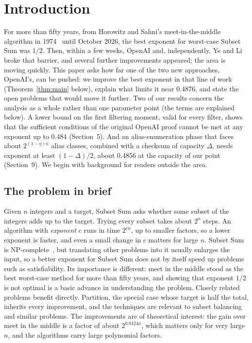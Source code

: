 \documentclass[11pt]{article}
\theoremstyle{plain}
\begin{document}
\section{Introduction}

For more than fifty years, from Horowitz and Sahni's meet-in-the-middle algorithm in 1974~\cite{hs} until October 2026, the best exponent for worst-case Subset Sum was $1/2$. Then, within a few weeks, OpenAI and, independently, Ye and Li broke that barrier, and several further improvements appeared; the area is moving quickly. This paper asks how far one of the two new approaches, OpenAI's, can be pushed: we improve the best exponent in that line of work (Theorem~\ref{thm:main} below), explain what limits it near 0.4876, and state the open problems that would move it further. Two of our results concern the analysis as a whole rather than one parameter point (the terms are explained below). A lower bound on the first filtering moment, valid for every filter, shows that the sufficient conditions of the original OpenAI proof cannot be met at any exponent up to 0.484 (Section~5). And an alias-enumeration phase that faces about $2^{(1-\eta)n}$ alias classes, combined with a checksum of capacity $\Delta$, needs exponent at least $(1 - \Delta)/2$, about 0.4856 at the capacity of our point (Section~9). We begin with background for readers outside the area.

\subsection*{The problem in brief}
Given $n$ integers and a target, Subset Sum asks whether some subset of the integers adds up to the target. Trying every subset takes about $2^n$ steps. An algorithm with \emph{exponent} $c$ runs in time $2^{cn}$, up to smaller factors, so a lower exponent is faster, and even a small change in $c$ matters for large $n$. Subset Sum is NP-complete~\cite{karp}, but translating other problems into it usually enlarges the input, so a better exponent for Subset Sum does not by itself speed up problems such as satisfiability. Its importance is different: meet in the middle stood as the best worst-case method for more than fifty years, and showing that exponent $1/2$ is not optimal is a basic advance in understanding the problem. Closely related problems benefit directly. Partition, the special case whose target is half the total, inherits every improvement, and the techniques are relevant to subset balancing and similar problems. The improvements are of theoretical interest: the gain over meet in the middle is a factor of about $2^{0.0124n}$, which matters only for very large $n$, and the algorithms carry large polynomial factors.
\end{document}
